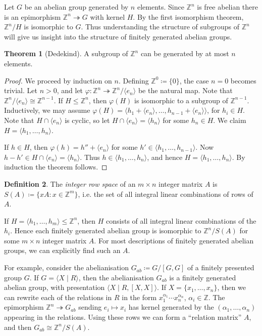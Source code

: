 \documentclass[12pt,a4paper,answers]{exam}
\newcommand{\Z}{\mathbb{Z}}
\theoremstyle{definition}
\newtheorem{theorem}{Theorem}[section]
\newtheorem{definition}[theorem]{Definition}
\begin{document}
Let $G$ be an abelian group generated by $n$ elements. Since $\Z^n$ is free abelian there is an epimorphism $\Z^n\twoheadrightarrow G$ with kernel $H$. By the first isomorphism theorem, $\Z^n/H$ is isomorphic to $G$. Thus understanding the structure of subgroups of $\Z^n$ will give us insight into the structure of finitely generated abelian groups.

\begin{theorem}[Dedekind]
  A subgroup of $\Z^n$ can be generated by at most $n$ elements.
\end{theorem}

\begin{proof}
  We proceed by induction on $n$. Defining $\Z^0\coloneqq\{0\}$, the case $n=0$ becomes trivial. Let $n>0$, and let $\varphi\colon\Z^n\twoheadrightarrow\Z^n/\langle e_n \rangle$ be the natural map. Note that $\Z^n/\langle e_n \rangle\cong\Z^{n-1}$. If $H\leq\Z^n$, then $\varphi(H)$ is isomorphic to a subgroup of $\Z^{n-1}$. Inductively, we may assume $\varphi(H)=\langle h_1 + \langle e_n \rangle, \ldots, h_{n-1} + \langle e_n \rangle \rangle$, for $h_i\in H$. Note that $H\cap\langle e_n \rangle$ is cyclic, so let $H\cap\langle e_n \rangle=\langle h_n \rangle$ for some $h_n\in H$. We claim $H=\langle h_1,\ldots,h_n \rangle$.

  If $h\in H$, then $\varphi(h)=h''+\langle e_n \rangle$ for some $h'\in\langle h_1,\ldots,h_{n-1} \rangle$. Now $h-h'\in H\cap\langle e_n \rangle=\langle h_n \rangle$. Thus $h\in\langle h_1,\ldots,h_n \rangle$, and hence $H=\langle h_1,\ldots,h_n \rangle$. By induction the theorem follows.
\end{proof}

\begin{definition}
  The \emph{integer row space} of an $m\times n$ integer matrix $A$ is $S(A)\coloneqq\{xA : x\in\Z^m\}$, i.e. the set of all integral linear combinations of rows of $A$.
\end{definition}

If $H=\langle h_1,\ldots,h_m \rangle\leq\Z^n$, then $H$ consists of all integral linear combinations of the $h_i$. Hence each finitely generated abelian group is isomorphic to $\Z^n/S(A)$ for some $m\times n$ integer matrix $A$. For most descriptions of finitely generated abelian groups, we can explicitly find such an $A$.

For example, consider the abelianisation $G_{ab}\coloneqq G/[G,G]$ of a finitely presented group $G$. If $G=\langle X \mid R \rangle$, then the abelianisation $G_{ab}$ is a finitely generated abelian group, with presentation $\langle X \mid R, [X,X] \rangle$. If $X=\{x_1,\ldots,x_n\}$, then we can rewrite each of the relations in $R$ in the form $x_1^{\alpha_1}\cdots x_n^{\alpha_n}$, $\alpha_i\in\Z$. The epimorphism $\Z^n\twoheadrightarrow G_{ab}$ sending $e_i\mapsto x_i$ has kernel generated by the $(\alpha_1,\ldots,\alpha_n)$ appearing in the relations. Using these rows we can form a ``relation matrix'' $A$, and then $G_{ab}\cong\Z^n/S(A)$.
\end{document}
